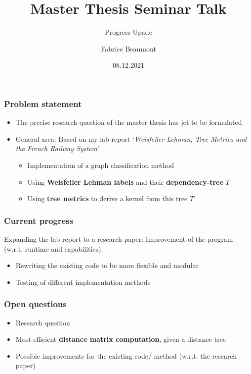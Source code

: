 

\title[MA Seminar Talk - Progress]{Master Thesis Seminar Talk}
\subtitle{Progress Upade}
\author[F. Beaumont]{Fabrice Beaumont}
\date{08.12.2021}

		

\begin{frame}
	\titlepage
\end{frame}

\begin{frame}
\frametitle{Problem statement}
	\begin{itemize}
		\item The precise research question of the master thesis has jet to be formulated\newline
		
		\item General area: Based on my lab report `\textit{Weisfeiler Lehman, Tree Metrics and
			the French Railway System}'
			\begin{itemize}
				\item Implementation of a graph classification method
				\item Using \textbf{Weisfeiler Lehman labels} and their \textbf{dependency-tree} $T$
				\item Using \textbf{tree metrics} to derive a kernel from this tree $T$
			\end{itemize}
	\end{itemize}	
 \end{frame}

\begin{frame}
\frametitle{Current progress}
	Expanding the lab report to a research paper: Improvement of the program (w.r.t. runtime and capabilities).
	\begin{itemize}
		\item Rewriting the existing code to be more flexible and modular
		\item Testing of different implementation methods
	\end{itemize}	
\end{frame}

\begin{frame}
\frametitle{Open questions}
	\begin{itemize}
		\item Research question\newline
		\item Most efficient \textbf{distance matrix computation}, given a distance tree\newline
		\item Possible improvements for the existing code/ method (w.r.t. the research paper)
	\end{itemize}	
\end{frame}

